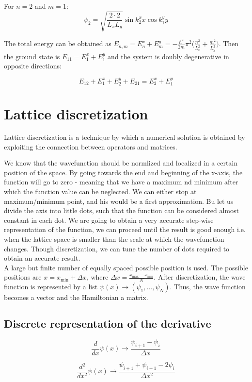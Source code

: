   For $n=2$ and $m=1$:
  $$\psi_2 = \sqrt{\frac{2 \cdot 2}{L_{x}L_{y}}} \sin k_2^x x \cos k_1^y y$$ 
  
  The total energy can be obtained as $E_{n,m} = E_n^x+E_m^y = -\frac{\hbar^2}{2m}\pi^2\biggl(\frac{n^2}{L_x^2}+\frac{m^2}{L_y^2}\biggr)$.
  Then the ground state is $E_{11} = E_1^x+E_1^y$ and the system is doubly degenerative in opposite directions:

  $$E_{12} + E_1^x+E_2^y + E_{21} = E_2^x+E_1^y$$

\section{Lattice discretization}
Lattice discretization is a technique by which a numerical solution is obtained by exploiting the connection between operators and matrices.

We know that the wavefunction should be normlized and localized in a certain position of the space. By going towards the end and beginning of the x-axis, the function will go to zero - meaning that we have a maximum nd minimum after which the function value can be neglected. We can either stop at maximum/minimum point, and his would be a first approximation. Bu let us divide the axis into little dots, such that the function can be considered almost constant in each dot. We are going to obtain a very accurate step-wise representation of the function, we can proceed until the result is good enough i.e. when the lattice space is smaller than the scale at which the wavefunction changes. Though discretization, we can tune the number of dots required to obtain an accurate result.\\

A large but finite number of equally spaced possible position is used. The possible positions are $x = x_{\min} + \Delta x$, where $\Delta x = \frac{x_{\max}-x_{\min}}{N}$. 
After discretization, the wave function is represented by a list $\psi(x) \rightarrow(\psi_1,\dots, \psi_N)$.
Thus, the wave function becomes a vector and the Hamiltonian a matrix.
  
  \subsection{Discrete representation of the derivative}

  $$\frac{d{}}{d{x}}\psi(x) \rightarrow \frac{\psi_{i+1}-\psi_i}{\Delta x}$$

  $$\frac{d{^2}}{d{x^2}}\psi(x) \rightarrow \frac{\psi_{i+1}+\psi_{i-1}-2\psi_i}{\Delta x^2}$$

